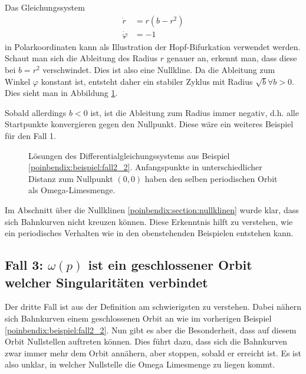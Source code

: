 \begin{beispiel} \label{poinbendix:beispiel:fall2_2}
Das Gleichungssystem
\begin{align*}
    \dot{r}       &= r(b-r^2) \\
    \dot{\varphi} &= -1
\end{align*}
in Polarkoordinaten kann als Illustration der Hopf-Bifurkation verwendet werden.
Schaut man sich die Ableitung des Radius $r$ genauer an, erkennt man, dass diese bei $b = r^2$ verschwindet.
Dies ist also eine Nullkline.
Da die Ableitung zum Winkel $\varphi$ konstant ist, entsteht daher ein stabiler Zyklus mit Radius $\sqrt{b} \forall b > 0$.
Dies sieht man in Abbildung \ref{poinbendix:fig:fall_2_2}.

Sobald allerdings $b < 0$ ist, ist die Ableitung zum Radius immer negativ, d.h. alle Startpunkte konvergieren gegen den Nullpunkt.
Diese wäre ein weiteres Beispiel für den Fall 1.
\end{beispiel}

\begin{figure}
\centering
    
    \caption{Lösungen des Differentialgleichungssystems aus Beispiel \ref{poinbendix:beispiel:fall2_2}.
    Anfangspunkte in unterschiedlicher Distanz zum Nullpunkt $(0,0)$ haben den selben periodischen Orbit als Omega-Limesmenge.}
\label{poinbendix:fig:fall_2_2}
\end{figure}

Im Abschnitt über die Nullklinen \ref{poinbendix:section:nullklinen} wurde klar, dass sich Bahnkurven nicht kreuzen können.
Diese Erkenntnis hilft zu verstehen, wie ein periodisches Verhalten wie in den obenstehenden Beispielen entstehen kann.

\subsection{Fall 3: $\omega(p)$ ist ein geschlossener Orbit welcher Singularitäten verbindet} \label{poinbendix:subsection:fall3}

Der dritte Fall ist aus der Definition am schwierigsten zu verstehen.
Dabei nähern sich Bahnkurven einem geschlossenen Orbit an wie im vorherigen Beispiel \ref{poinbendix:beispiel:fall2_2}.
Nun gibt es aber die Besonderheit, dass auf diesem Orbit Nullstellen auftreten können.
Dies führt dazu, dass sich die Bahnkurven zwar immer mehr dem Orbit annähern, aber stoppen, sobald er erreicht ist.
Es ist also unklar, in welcher Nullstelle die Omega Limesmenge zu liegen kommt.

